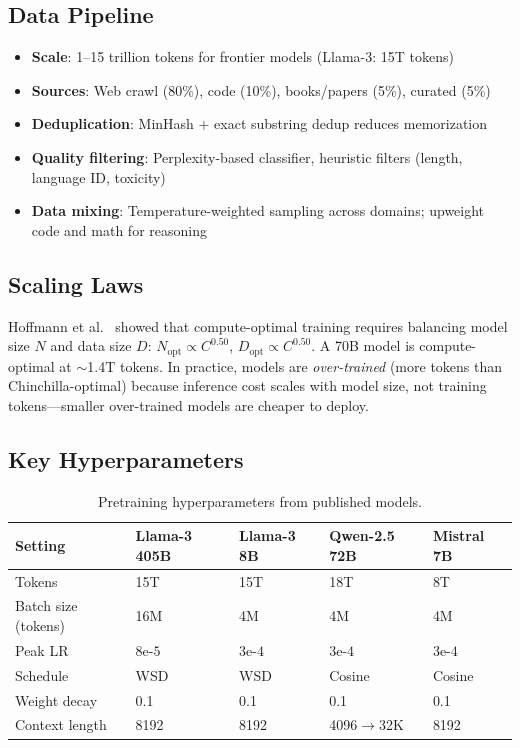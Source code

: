 \subsection{Data Pipeline}
\label{data-pipeline}

\begin{keybox}
\begin{itemize}
  \item \textbf{Scale}: 1--15 trillion tokens for frontier models (Llama-3: 15T tokens)
  \item \textbf{Sources}: Web crawl (80\%), code (10\%), books/papers (5\%), curated (5\%)
  \item \textbf{Deduplication}: MinHash + exact substring dedup reduces memorization~\cite{lee2022deduplicating}
  \item \textbf{Quality filtering}: Perplexity-based classifier, heuristic filters (length, language ID, toxicity)
  \item \textbf{Data mixing}: Temperature-weighted sampling across domains; upweight code and math for reasoning
\end{itemize}
\end{keybox}

\subsection{Scaling Laws}
\label{scaling-laws}

Hoffmann et al.~\cite{hoffmann2022chinchilla} showed that compute-optimal training requires balancing model size $N$ and data size $D$: $N_\text{opt} \propto C^{0.50}$, $D_\text{opt} \propto C^{0.50}$. A 70B model is compute-optimal at $\sim$1.4T tokens. In practice, models are \emph{over-trained} (more tokens than Chinchilla-optimal) because inference cost scales with model size, not training tokens---smaller over-trained models are cheaper to deploy.

\subsection{Key Hyperparameters}
\label{key-hyperparameters}

\begin{table}[ht!]
\centering
\caption{Pretraining hyperparameters from published models.}
\begin{tabular}{@{}lp{2.5cm}p{2.8cm}p{2.8cm}p{2.8cm}@{}}
\toprule
\textbf{Setting} & \textbf{Llama-3 405B} & \textbf{Llama-3 8B} & \textbf{Qwen-2.5 72B} & \textbf{Mistral 7B} \\
\midrule
Tokens & 15T & 15T & 18T & 8T \\
Batch size (tokens) & 16M & 4M & 4M & 4M \\
Peak LR & $8\text{e-}5$ & $3\text{e-}4$ & $3\text{e-}4$ & $3\text{e-}4$ \\
Schedule & WSD & WSD & Cosine & Cosine \\
Weight decay & 0.1 & 0.1 & 0.1 & 0.1 \\
Context length & 8192 & 8192 & 4096$\to$32K & 8192 \\
\bottomrule
\end{tabular}
\end{table}

